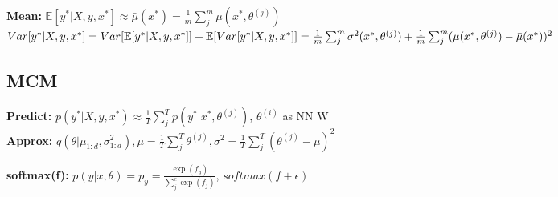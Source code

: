 \textbf{Mean:} $\mathbb{E}[y^*|X,y,x^*]  
\approx \bar{\mu}(x^*) 
=\frac{1}{m}\sum_j^m \mu(x^*, \theta^{(j)})$\\

$Var[y^*|X,y,x^*] = Var[\mathbb{E}[y^*|X,y,x^*]] + \mathbb{E}[Var[y^*|X,y,x^*]] \\
= \frac{1}{m}\sum_j^m \sigma^2(x^*, \theta^{(j)}) + \frac{1}{m}\sum_j^m (\mu(x^*, \theta^{(j)}) - \bar{\mu}(x^*))^2$\\
\begin{comment}
	The variance of the prediction is dependent on the variance of the weights.\\
	We can split up the uncertainty into Aleatoric (sigma-term) and epistemic (mu-term)\\
\end{comment}

\subsection{MCM}
\textbf{Predict:} $p(y^*| X,y,x^*) \approx \frac{1}{T} \sum_j^T p(y^*| x^*, \theta^{(j)})$, $\theta^{(i)}$ as NN W\\

\textbf{Approx:} $q(\theta| \mu_{1:d}, \sigma^2_{1:d}), \mu = \frac{1}{T} \sum_j^T \theta^{(j)},
\sigma^2 = \frac{1}{T} \sum_j^T (\theta^{(j)} - \mu)^2$\\
\begin{comment}
	We can keep track of the weight means and variances by keeping a running average while monte-carlo sampling.
	The parameters can then easily be approximated with a Gaussian.\\ 
\end{comment}

\textbf{softmax(f):} $p(y|x,\theta) = p_y = \frac{\exp(f_y)}{\sum_j^c \exp(f_j)}$, $softmax(f+\epsilon)$\\
\begin{comment}
	Gives probability distribution over the c classes.\\
	We can inject noise $softmax(f+\epsilon)$, saying that we are unsure about some parts of the predictive classes. This is analog to adding Epistemic noise, just for classification.\\
\end{comment}
















